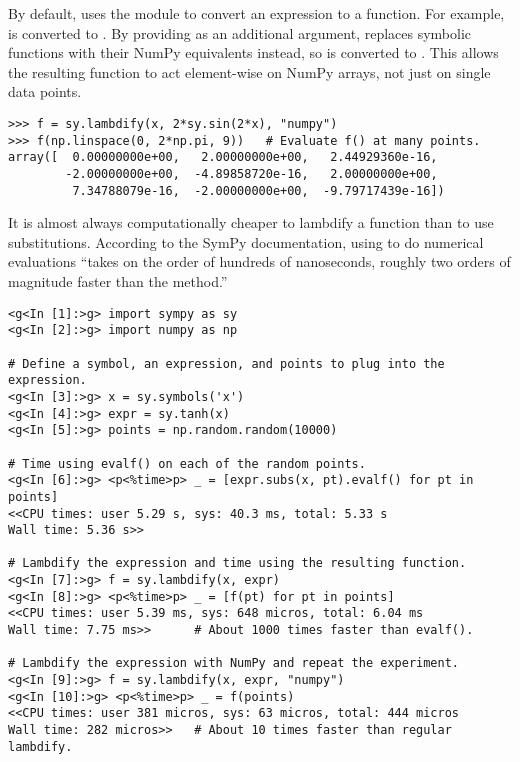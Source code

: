 By default,  uses the  module to convert an expression to a function.
For example,  is converted to .
By providing  as an additional argument,  replaces symbolic functions with their NumPy equivalents instead, so  is converted to .
This allows the resulting function to act element-wise on NumPy arrays, not just on single data points.

\begin{lstlisting}
>>> f = sy.lambdify(x, 2*sy.sin(2*x), "numpy")
>>> f(np.linspace(0, 2*np.pi, 9))   # Evaluate f() at many points.
array([  0.00000000e+00,   2.00000000e+00,   2.44929360e-16,
        -2.00000000e+00,  -4.89858720e-16,   2.00000000e+00,
         7.34788079e-16,  -2.00000000e+00,  -9.79717439e-16])
\end{lstlisting}

\begin{info}
It is almost always computationally cheaper to lambdify a function than to use substitutions.
According to the SymPy documentation, using  to do numerical evaluations ``takes on the order of hundreds of nanoseconds, roughly two orders of magnitude faster than the  method.''

\begin{lstlisting}
<g<In [1]:>g> import sympy as sy
<g<In [2]:>g> import numpy as np

# Define a symbol, an expression, and points to plug into the expression.
<g<In [3]:>g> x = sy.symbols('x')
<g<In [4]:>g> expr = sy.tanh(x)
<g<In [5]:>g> points = np.random.random(10000)

# Time using evalf() on each of the random points.
<g<In [6]:>g> <p<%time>p> _ = [expr.subs(x, pt).evalf() for pt in points]
<<CPU times: user 5.29 s, sys: 40.3 ms, total: 5.33 s
Wall time: 5.36 s>>

# Lambdify the expression and time using the resulting function.
<g<In [7]:>g> f = sy.lambdify(x, expr)
<g<In [8]:>g> <p<%time>p> _ = [f(pt) for pt in points]
<<CPU times: user 5.39 ms, sys: 648 micros, total: 6.04 ms
Wall time: 7.75 ms>>      # About 1000 times faster than evalf().

# Lambdify the expression with NumPy and repeat the experiment.
<g<In [9]:>g> f = sy.lambdify(x, expr, "numpy")
<g<In [10]:>g> <p<%time>p> _ = f(points)
<<CPU times: user 381 micros, sys: 63 micros, total: 444 micros
Wall time: 282 micros>>   # About 10 times faster than regular lambdify.
\end{lstlisting}
\end{info}


